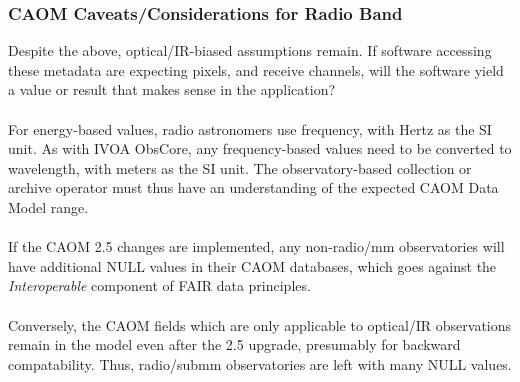 \subsubsection{CAOM Caveats/Considerations for Radio Band}
Despite the above, optical/IR-biased assumptions remain.  If software accessing these metadata are expecting pixels, and receive channels, will the software yield a value or result that makes sense in the application?  
\\
\\For energy-based values, radio astronomers use frequency, with Hertz as the SI unit.  As with IVOA ObsCore, any frequency-based values need to be converted to wavelength, with meters as the SI unit.  The observatory-based collection or archive operator must thus have an understanding of the expected CAOM Data Model range.
\\
\\ If the CAOM 2.5 changes are implemented, any non-radio/mm observatories will have additional NULL values in their CAOM databases, which goes against the \textit{Interoperable} component of FAIR data principles.  
\\
\\Conversely, the CAOM fields which are only applicable to optical/IR observations remain in the model even after the 2.5 upgrade, presumably for backward compatability.  Thus, radio/submm observatories are left with many NULL values.  

